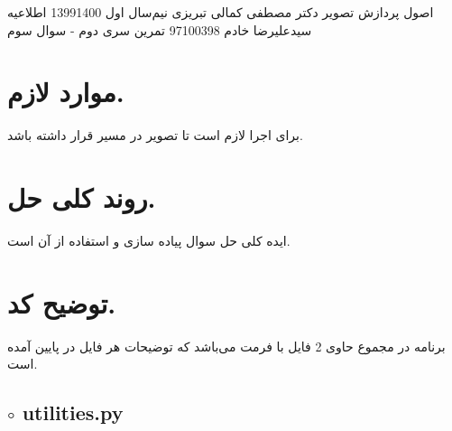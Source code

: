 \documentclass[a4paper,12pt]{article}
\begin{document}
\handout
{اصول پردازش تصویر}
{دکتر مصطفی کمالی تبریزی}
{نیم‌سال اول 1399\lr{-}1400}
{اطلاعیه}
{سیدعلیرضا خادم}
{97100398}
{تمرین سری دوم - سوال سوم}
\section*{موارد لازم.}
برای اجرا لازم است تا تصویر
در مسیر
قرار داشته باشد.
\section*{روند کلی حل.}
ایده کلی حل سوال پیاده سازی 
و استفاده از آن است.
\section*{توضیح کد.}
برنامه در مجموع حاوی 2 فایل با فرمت
می‌باشد که توضیحات هر فایل در پایین آمده است.
\subsection*{$\circ$ utilities.py}
\end{document}
